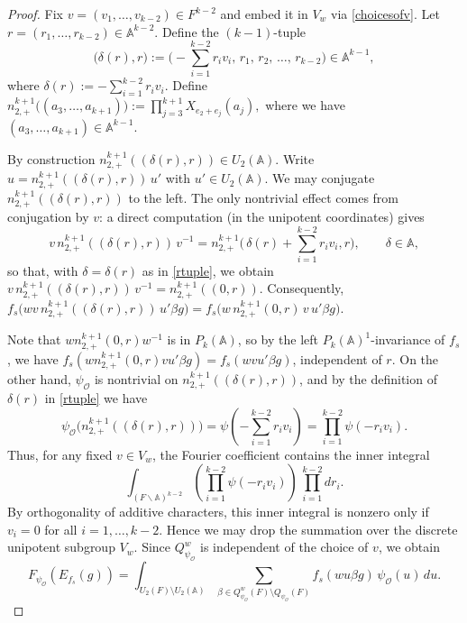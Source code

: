 \documentclass[11pt,notitlepage]{amsart}
\theoremstyle{definition}
\theoremstyle{remark}
\newcommand{\calO}{\mathcal{O}}
\newcommand{\bbA}{\mathbb{A}}
\begin{document}
\begin{proof}
\newcommand{\nTwoPlus}{n_{2,+}^{k+1}}

Fix $v=(v_1,\dots,v_{k-2})\in F^{k-2}$ and embed it in $V_w$ via \eqref{choicesofv}.
Let $r=(r_1,\dots,r_{k-2})\in \bbA^{k-2}$. Define the $(k-1)$-tuple
\begin{equation}\label{rtuple}
    \bigl(\delta(r), r\bigr) := \bigl(-\sum_{i=1}^{k-2}r_iv_i,\, r_1,\, r_2,\, \dots,\, r_{k-2}\bigr) \in \bbA^{k-1},
\end{equation}
where $\delta(r) := -\sum_{i=1}^{k-2} r_i v_i$. Define
    $\nTwoPlus\bigl((a_3, \dots, a_{k+1})\bigr) := \prod_{j=3}^{k+1} X_{e_2 + e_j}(a_j),
    $ where we have $(a_3, \dots, a_{k+1}) \in \bbA^{k-1}$.

By construction $n_{2,+}^{k+1}((\delta(r),r))\in U_2(\bbA)$. Write $u=n_{2,+}^{k+1}((\delta(r),r))\,u'$ with $u'\in U_2(\bbA)$. We may conjugate $n_{2,+}^{k+1}((\delta(r),r))$ to the left.
The only nontrivial effect comes from conjugation by $v$:
a direct computation (in the unipotent coordinates) gives
\begin{equation}\label{viotaconj}
v\,n_{2,+}^{k+1}((\delta(r),r))\,v^{-1}=n_{2,+}^{k+1}\!\bigl(\,\delta(r)+\sum_{i=1}^{k-2}r_i v_i,r\bigr),
\qquad \delta\in \bbA,
\end{equation}
so that, with $\delta=\delta(r)$ as in \eqref{rtuple}, we obtain
$v\,n_{2,+}^{k+1}((\delta(r),r))\,v^{-1}=n_{2,+}^{k+1}((0,r))$. Consequently,
$f_s\bigl(wv\,n_{2,+}^{k+1}((\delta(r),r))\,u' \beta g\bigr)
=f_s\bigl(w\,n_{2,+}^{k+1}(0,r)\,v\,u'\beta g\bigr)$.

Note that $wn_{2,+}^{k+1}(0,r)w^{-1}$ is in $P_k(\bbA)$, so by the left $P_k(\bbA)^1$-invariance of $f_s$, we have $f_s(wn_{2,+}^{k+1}(0,r)vu'\beta g) = f_s(wvu'\beta g)$, independent of $r$. On the other hand, $\psi_\calO$ is nontrivial on $n_{2,+}^{k+1}((\delta(r),r))$, and by the definition of
$\delta(r)$ in \eqref{rtuple} we have
\[
\psi_\calO\bigl(n_{2,+}^{k+1}((\delta(r),r))\bigr)
=\psi\!\left(-\sum_{i=1}^{k-2}r_i v_i\right)
=\prod_{i=1}^{k-2}\psi(-r_i v_i).
\]
Thus, for any fixed $v\in V_w$, the Fourier coefficient contains the inner integral
\[
\int_{(F\backslash\bbA)^{k-2}}
\left(\prod_{i=1}^{k-2}\psi(-r_i v_i)\right)\,\prod_{i=1}^{k-2}dr_i.
\]
By orthogonality of additive characters, this inner integral is nonzero only if $v_i=0$ for all
$i=1,\dots,k-2$. Hence we may drop the summation over the discrete unipotent subgroup $V_w$. Since $Q_{\psi_\calO}^w$ is independent of the choice of $v$, we obtain
\begin{equation}\label{eq:afterV}
F_{\psi_\calO}(E_{f_s}(g))
=\int_{U_2(F)\setminus U_2(\bbA)}
\sum_{\beta\in Q_{\psi_\calO}^w(F)\setminus Q_{\psi_\calO}(F)}
f_s(w u\beta g)\,\psi_\calO(u)\,du.
\end{equation}


\end{proof}
\end{document}
